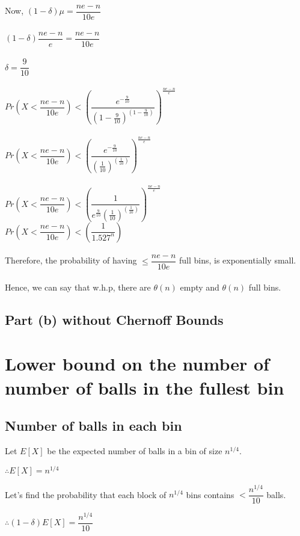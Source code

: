 \documentclass{article}
\begin{document}
Now, $(1-\delta)\mu = \dfrac{ne-n}{10e}$\\
\\
$(1-\delta)\dfrac{ne-n}{e} = \dfrac{ne-n}{10e}$\\
\\
$\delta = \dfrac{9}{10}$\\
\\
$Pr\left(X < \dfrac{ne-n}{10e}\right) < \left(\dfrac{e^{-\frac{9}{10}}}{(1-\frac{9}{10})^{(1-\frac{9}{10})}}\right)^{\frac{ne-n}{e}}$\\
\\
$Pr\left(X < \dfrac{ne-n}{10e}\right) < \left(\dfrac{e^{-\frac{9}{10}}}{(\frac{1}{10})^{(\frac{1}{10})}}\right)^{\frac{ne-n}{e}}$\\
\\
$Pr\left(X < \dfrac{ne-n}{10e}\right) < \left(\dfrac{1}{e^{\frac{9}{10}}(\frac{1}{10})^{(\frac{1}{10})}}\right)^{\frac{ne-n}{e}}$\\
$Pr\left(X < \dfrac{ne-n}{10e}\right) < \left(\dfrac{1}{1.527^{n}}\right)$\\
\\
Therefore, the probability of having $\leq \dfrac{ne-n}{10e} $ full bins, is exponentially small.\\
\\
Hence, we can say that w.h.p, there are $\theta(n)$ empty and $\theta(n)$ full bins.

\subsection{Part (b) without Chernoff Bounds}
\clearpage

\section {Lower bound on the number of number of balls in the fullest bin}

\subsection{Number of balls in each bin}

Let $E[X] $ be the expected number of balls in a bin of size $n^{1/4}$.

$\therefore E[X] = n^{1/4}$

Let's find the probability that each block of $n^{1/4}$ bins contains $< \dfrac{n^{1/4}}{10}$ balls.

$\therefore (1-\delta)E[X] = \dfrac{n^{1/4}}{10}$
\end{document}
